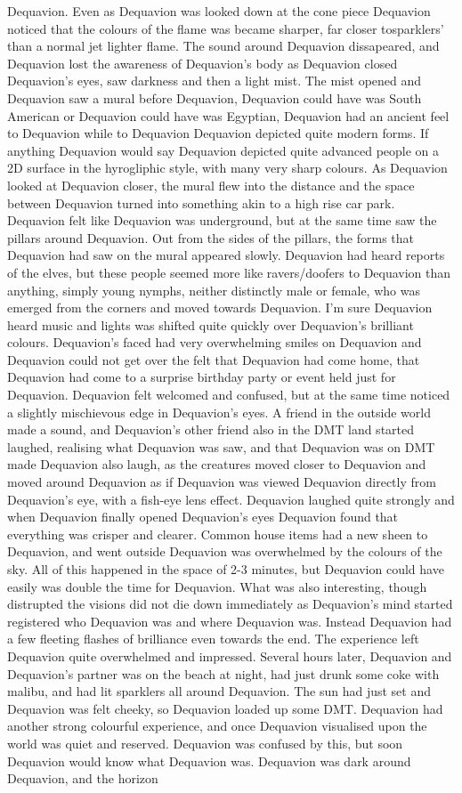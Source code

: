 \documentclass[12pt]{book}
\begin{document}
Dequavion. Even as Dequavion was looked down at the cone piece Dequavion noticed that the colours of the flame was became sharper, far closer tosparklers' than a normal jet lighter flame. The sound around Dequavion dissapeared, and Dequavion lost the awareness of Dequavion's body as Dequavion closed Dequavion's eyes, saw darkness and then a light mist. The mist opened and Dequavion saw a mural before Dequavion, Dequavion could have was South American or Dequavion could have was Egyptian, Dequavion had an ancient feel to Dequavion while to Dequavion Dequavion depicted quite modern forms. If anything Dequavion would say Dequavion depicted quite advanced people on a 2D surface in the hyrogliphic style, with many very sharp colours. As Dequavion looked at Dequavion closer, the mural flew into the distance and the space between Dequavion turned into something akin to a high rise car park. Dequavion felt like Dequavion was underground, but at the same time saw the pillars around Dequavion. Out from the sides of the pillars, the forms that Dequavion had saw on the mural appeared slowly. Dequavion had heard reports of the elves, but these people seemed more like ravers/doofers to Dequavion than anything, simply young nymphs, neither distinctly male or female, who was emerged from the corners and moved towards Dequavion. I'm sure Dequavion heard music and lights was shifted quite quickly over Dequavion's brilliant colours. Dequavion's faced had very overwhelming smiles on Dequavion and Dequavion could not get over the felt that Dequavion had come home, that Dequavion had come to a surprise birthday party or event held just for Dequavion. Dequavion felt welcomed and confused, but at the same time noticed a slightly mischievous edge in Dequavion's eyes. A friend in the outside world made a sound, and Dequavion's other friend also in the DMT land started laughed, realising what Dequavion was saw, and that Dequavion was on DMT made Dequavion also laugh, as the creatures moved closer to Dequavion and moved around Dequavion as if Dequavion was viewed Dequavion directly from Dequavion's eye, with a fish-eye lens effect. Dequavion laughed quite strongly and when Dequavion finally opened Dequavion's eyes Dequavion found that everything was crisper and clearer. Common house items had a new sheen to Dequavion, and went outside Dequavion was overwhelmed by the colours of the sky. All of this happened in the space of 2-3 minutes, but Dequavion could have easily was double the time for Dequavion. What was also interesting, though distrupted the visions did not die down immediately as Dequavion's mind started registered who Dequavion was and where Dequavion was. Instead Dequavion had a few fleeting flashes of brilliance even towards the end. The experience left Dequavion quite overwhelmed and impressed. Several hours later, Dequavion and Dequavion's partner was on the beach at night, had just drunk some coke with malibu, and had lit sparklers all around Dequavion. The sun had just set and Dequavion was felt cheeky, so Dequavion loaded up some DMT. Dequavion had another strong colourful experience, and once Dequavion visualised upon the world was quiet and reserved. Dequavion was confused by this, but soon Dequavion would know what Dequavion was. Dequavion was dark around Dequavion, and the horizon 
\end{document}
